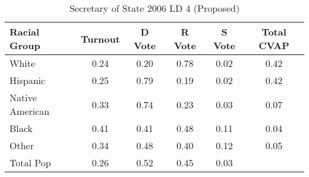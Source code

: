 \begin{table}[htb]
\begin{center}
\caption{Secretary of State 2006 LD 4 (Proposed)}
\label{sos06_cvap_ld_4}
\begin{tabular}{lccccc}
  \hline
Racial Group & Turnout & D Vote & R Vote & S Vote & Total CVAP \\ 
  \hline
White & 0.24 & 0.20 & 0.78 & 0.02 & 0.42 \\ 
  Hispanic & 0.25 & 0.79 & 0.19 & 0.02 & 0.42 \\ 
  Native American & 0.33 & 0.74 & 0.23 & 0.03 & 0.07 \\ 
  Black & 0.41 & 0.41 & 0.48 & 0.11 & 0.04 \\ 
  Other & 0.34 & 0.48 & 0.40 & 0.12 & 0.05 \\ 
  Total Pop & 0.26 & 0.52 & 0.45 & 0.03 &  \\ 
   \hline
\end{tabular}
\end{center}
\end{table}
